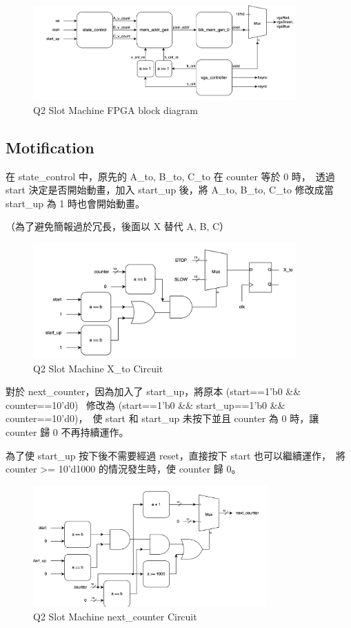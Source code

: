 \documentclass[10.5pt,compsoc,UTF8]{CjC}
\theoremstyle{mystyle}
\begin{document}
\begin{figure}[!h]
  \centering
  \includegraphics[width=0.9\textwidth]{./img/slot-1.png}
  \caption{Q2 Slot Machine FPGA block diagram}
  \label{fig:slot-1}
\end{figure}

\subsection{Motification}

在 state\_control 中，原先的 A\_to, B\_to, C\_to 在 counter 等於 0 時，\
透過 start 決定是否開始動畫，加入 start\_up 後，將 A\_to, B\_to, C\_to 修改成當 start\_up 為 1 時也會開始動畫。

（為了避免簡報過於冗長，後面以 X 替代 A, B, C）

\begin{figure}[!h]
  \centering
  \includegraphics[width=0.9\textwidth]{./img/slot-2.png}
  \caption{Q2 Slot Machine X\_to Circuit}
  \label{fig:slot-2}
\end{figure}

對於 next\_counter，因為加入了 start\_up，將原本 (start==1'b0 \&\& counter==10'd0) \
修改為 (start==1'b0 \&\& start\_up==1'b0 \&\& counter==10'd0)，\
使 start 和 start\_up 未按下並且 counter 為 0 時，讓 counter 歸 0 不再持續運作。
\par
為了使 start\_up 按下後不需要經過 reset，直接按下 start 也可以繼續運作，\
將 counter >= 10'd1000 的情況發生時，使 counter 歸 0。

\begin{figure}[!h]
  \centering
  \includegraphics[width=0.8\textwidth]{./img/slot-3.png}
  \caption{Q2 Slot Machine next\_counter Circuit}
  \label{fig:slot-3}
\end{figure}
\end{document}

